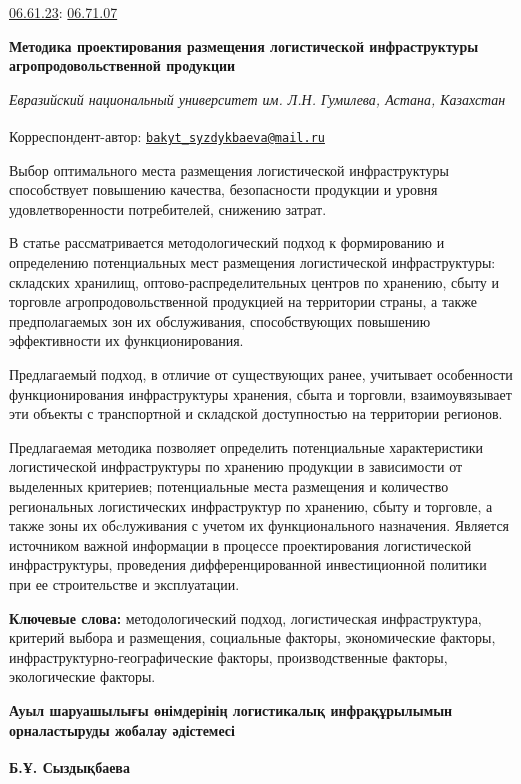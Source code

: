 \href{https://grnti.ru/?p1=06&p2=61&p3=23}{06.61.23}:
\href{https://grnti.ru/?p1=06&p2=71&p3=07}{06.71.07}

{\bfseries Методика проектирования размещения логистической инфраструктуры
агропродовольственной продукции}


\emph{Евразийский национальный университет им. Л.Н. Гумилева, Астана,
Казахстан}

{\bfseries \textsuperscript{\envelope }}Корреспондент-автор:
\href{mailto:bakyt_syzdykbaeva@mail.ru}{\nolinkurl{bakyt\_syzdykbaeva@mail.ru}}

Выбор оптимального места размещения логистической инфраструктуры
способствует повышению качества, безопасности продукции и уровня
удовлетворенности потребителей, снижению затрат.

В статье рассматривается методологический подход к формированию и
определению потенциальных мест размещения логистической инфраструктуры:
складских хранилищ, оптово-распределительных центров по хранению, сбыту
и торговле агропродовольственной продукцией на территории страны, а
также предполагаемых зон их обслуживания, способствующих повышению
эффективности их функционирования.

Предлагаемый подход, в отличие от существующих ранее, учитывает
особенности функционирования инфраструктуры хранения, сбыта и торговли,
взаимоувязывает эти объекты с транспортной и складской доступностью на
территории регионов.

Предлагаемая методика позволяет определить потенциальные характеристики
логистической инфраструктуры по хранению продукции в зависимости от
выделенных критериев; потенциальные места размещения и количество
региональных логистических инфраструктур по хранению, сбыту и торговле,
а также зоны их обcлуживания с учетом их функционального назначения.
Является источником важной информации в процессе проектирования
логистической инфраструктуры, проведения дифференцированной
инвестиционной политики при ее строительстве и эксплуатации.

{\bfseries Ключевые слова:} методологический подход, логистическая
инфраструктура, критерий выбора и размещения, социальные факторы,
экономические факторы, инфраструктурно-географические факторы,
производственные факторы, экологические факторы.

{\bfseries Ауыл шаруашылығы өнімдерінің логистикалық инфрақұрылымын
орналастыруды жобалау әдістемесі}

{\bfseries Б.Ұ. Сыздықбаева\textsuperscript{\envelope }}

